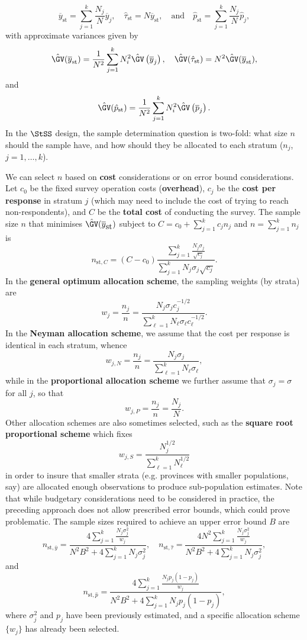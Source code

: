 $$\overline{y}_{\textrm{st}}=\sum_{j=1}^k \frac{N_j}{N}\overline{y}_j, \quad \hat{\tau}_{\textrm{st}}=N\overline{y}_{\textrm{st}}, \quad\mbox{and}\quad \hat{p}_{\textrm{st}}=\sum_{j=1}^k \frac{N_j}{N}\hat{p}_j,$$ with approximate variances given by 
$$\hat{\GV}(\overline{y}_{\textrm{st}})=\frac{1}{N^2}\sum_{j=1}^kN_i^2\hat{\GV}\left(\overline{y}_j\right),\quad \hat{\GV}(\hat{\tau}_{\textrm{st}})=N^2\hat{\GV}(\overline{y}_{\textrm{st}}),$$ and $$\hat{\GV}(\hat{p}_{\textrm{st}})=\frac{1}{N^2}\sum_{j=1}^kN_i^2\hat{\GV}\left(\overline{p}_j\right).$$
In the $\StSS$ design, the sample determination question is two-fold: what size $n$ should the sample have, and how should they be allocated to each stratum ($n_j$, $j=1,\ldots,k$). \par We can select $n$ based on \textbf{cost} considerations or on error bound considerations. Let $c_0$ be the fixed survey operation costs (\textbf{overhead}), $c_j$ be the \textbf{cost per response} in  stratum $j$ (which may need to include the cost of trying to reach non-respondents), and $C$ be the \textbf{total cost} of conducting the survey. The sample size $n$ that minimises  $\hat{\GV}(\overline{y}_{\mbox{st}})$ subject to   $C=c_0+\sum_{j=1}^kc_jn_j$ and $n=\sum_{j=1}^kn_j$ is $$n_{\textrm{st},C}=(C-c_0)\frac{\sum_{j=1}^k \frac{N_j\sigma_j}{\sqrt{c_j}}}{\sum_{j=1}^k N_j\sigma_j\sqrt{c_j}}.$$ In the \textbf{general optimum allocation scheme}, the sampling weights (by strata) are $$w_j=\frac{n_j}{n}=\frac{N_j\sigma_jc_{j}^{-1/2}}{\sum_{\ell=1}^kN_{\ell}\sigma_{\ell}c_{\ell}^{-1/2}}.$$ 
In the \textbf{Neyman allocation scheme}, we assume that the cost per response is identical in each stratum, whence 
$$w_{j,N}=\frac{n_j}{n}=\frac{N_j\sigma_j}{\sum_{\ell=1}^kN_{\ell}\sigma_{\ell}},$$ while in the \textbf{proportional allocation scheme} we further assume that $\sigma_j=\sigma$ for all $j$, so that $$w_{j,P}=\frac{n_j}{n}=\frac{N_j}{N}.$$ Other allocation schemes are also sometimes selected, such as the \textbf{square root proportional scheme} which fixes $$w_{j,S}=\frac{N_j^{1/2}}{\sum_{\ell=1}^kN_{\ell}^{1/2}}$$ in order to insure that smaller strata (e.g. provinces with smaller populations, say) are allocated enough observations to produce sub-population estimates. \newl Note that while budgetary considerations need to be considered in practice, the preceding approach does not allow prescribed error bounds, which could prove problematic. The sample sizes required to achieve an upper error bound $B$ are\small $$n_{\textrm{st},\overline{y}}=\frac{4\sum_{j=1}^k\frac{N_j\sigma_j^2}{w_j}}{N^2B^2+4\sum_{j=1}^kN_j\sigma_j^2},\quad n_{\textrm{st},\hat{\tau}}=\frac{4N^2\sum_{j=1}^k\frac{N_j\sigma_j^2}{w_j}}{N^2B^2+4\sum_{j=1}^kN_j\sigma_j^2},$$ and $$n_{\textrm{st},\hat{p}}=\frac{4\sum_{j=1}^k\frac{N_jp_j(1-p_j)}{w_j}}{N^2B^2+4\sum_{j=1}^kN_jp_j(1-p_j)},$$ \normalsize where $\sigma_j^2$ and $p_j$ have been previously estimated, and a specific allocation scheme  $\{w_j\}$ has already been selected. \newl 
